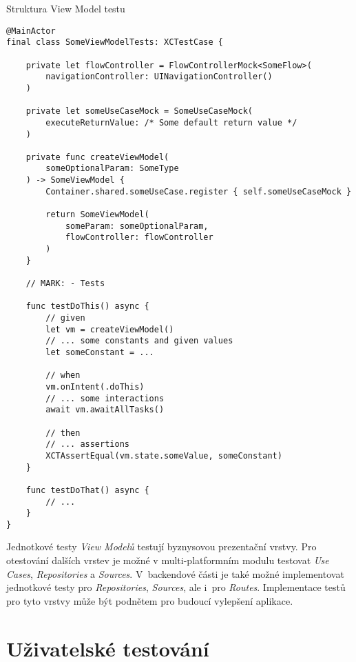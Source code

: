 \begin{listing}
\caption{Struktura View Model testu}\label{code:vm-test-sctructure}
\begin{verbatim}
@MainActor
final class SomeViewModelTests: XCTestCase {

    private let flowController = FlowControllerMock<SomeFlow>(
        navigationController: UINavigationController()
    )
    
    private let someUseCaseMock = SomeUseCaseMock(
        executeReturnValue: /* Some default return value */
    )
    
    private func createViewModel(
        someOptionalParam: SomeType
    ) -> SomeViewModel {
        Container.shared.someUseCase.register { self.someUseCaseMock }
	
        return SomeViewModel(
            someParam: someOptionalParam,
            flowController: flowController
        )
    }
    
    // MARK: - Tests
    
    func testDoThis() async {
        // given
        let vm = createViewModel()
        // ... some constants and given values
        let someConstant = ...
    	
        // when
        vm.onIntent(.doThis)
        // ... some interactions
        await vm.awaitAllTasks()
		
        // then
        // ... assertions
        XCTAssertEqual(vm.state.someValue, someConstant)
    }
    
    func testDoThat() async {
        // ...
    }
}
\end{verbatim}
\end{listing}

Jednotkové testy \emph{View Modelů} testují byznysovou prezentační vrstvy. Pro otestování dalších vrstev je možné v multi-platformním modulu testovat \emph{Use Cases}, \emph{Repositories} a \emph{Sources}. V~backendové části je také možné implementovat jednotkové testy pro \emph{Repositories}, \emph{Sources}, ale i~pro \emph{Routes}. Implementace testů pro tyto vrstvy může být podnětem pro budoucí vylepšení aplikace.

\section{Uživatelské testování}

